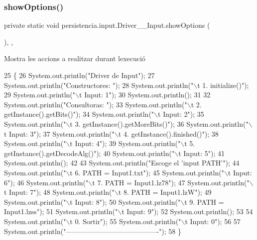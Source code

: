 \subsubsection{\texorpdfstring{show\+Options()}{showOptions()}}
{\footnotesize\ttfamily private static void persistencia.\+input.\+Driver\+\_\+\+\_\+\+Input.\+show\+Options (\begin{DoxyParamCaption}{ }\end{DoxyParamCaption})\hspace{0.3cm}{\ttfamily [inline]}, {\ttfamily [static]}, {\ttfamily [private]}}



Mostra les accions a realitzar durant l\textquotesingle{}execució 


\begin{DoxyCode}
25                                      \{
26         System.out.println(\textcolor{stringliteral}{"Driver de Input"});
27         System.out.println(\textcolor{stringliteral}{"Constructores: "});
28         System.out.println(\textcolor{stringliteral}{"\(\backslash\)t 1. initialize()"});
29         System.out.println(\textcolor{stringliteral}{"\(\backslash\)t Input: 1"});
30         System.out.println();
31 
32         System.out.println(\textcolor{stringliteral}{"Consultoras: "});
33         System.out.println(\textcolor{stringliteral}{"\(\backslash\)t 2. getInstance().getBits()"});
34         System.out.println(\textcolor{stringliteral}{"\(\backslash\)t Input: 2"});
35         System.out.println(\textcolor{stringliteral}{"\(\backslash\)t 3. getInstance().getMoreBits()"});
36         System.out.println(\textcolor{stringliteral}{"\(\backslash\)t Input: 3"});
37         System.out.println(\textcolor{stringliteral}{"\(\backslash\)t 4. getInstance().finished()"});
38         System.out.println(\textcolor{stringliteral}{"\(\backslash\)t Input: 4"});
39         System.out.println(\textcolor{stringliteral}{"\(\backslash\)t 5. getInstance().getDecodeAlg()"});
40         System.out.println(\textcolor{stringliteral}{"\(\backslash\)t Input: 5"});
41         System.out.println();
42 
43         System.out.println(\textcolor{stringliteral}{"Escoge el 'input PATH'"});
44         System.out.println(\textcolor{stringliteral}{"\(\backslash\)t 6. PATH = Input1.txt"});
45         System.out.println(\textcolor{stringliteral}{"\(\backslash\)t Input: 6"});
46         System.out.println(\textcolor{stringliteral}{"\(\backslash\)t 7. PATH = Input1.lz78"});
47         System.out.println(\textcolor{stringliteral}{"\(\backslash\)t Input: 7"});
48         System.out.println(\textcolor{stringliteral}{"\(\backslash\)t 8. PATH = Input1.lzW"});
49         System.out.println(\textcolor{stringliteral}{"\(\backslash\)t Input: 8"});
50         System.out.println(\textcolor{stringliteral}{"\(\backslash\)t 9. PATH = Input1.lzss"});
51         System.out.println(\textcolor{stringliteral}{"\(\backslash\)t Input: 9"});
52         System.out.println();
53 
54         System.out.println(\textcolor{stringliteral}{"\(\backslash\)t 0. Sortir"});
55         System.out.println(\textcolor{stringliteral}{"\(\backslash\)t Input: 0"});
56 
57         System.out.println(\textcolor{stringliteral}{"----------------------------------------"});
58     \}
\end{DoxyCode}


